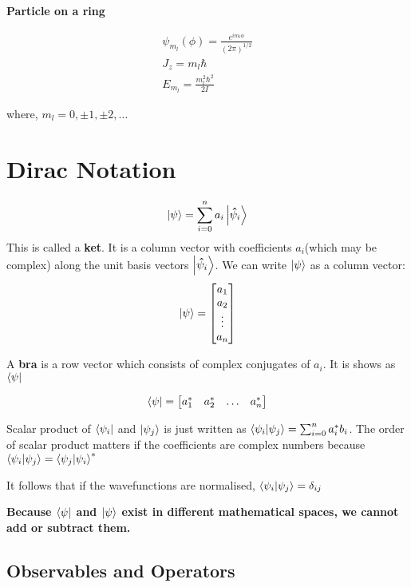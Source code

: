 \documentclass[11pt]{article}
\theoremstyle{definition}
\begin{document}
\begin{shaded}
\textbf{Particle on a ring}

\begin{gather*}
    \psi_{m_l}(\phi) = \frac{e^{i m_l \phi}}{(2\pi)^{1/2}}\\
    J_{z} = m_l \hbar \\
    E_{m_l} = \frac{m_l ^2 \hbar^2}{2I}
\end{gather*}

where, $m_l = 0, \pm 1, \pm 2, \dots$
\end{shaded}

\section{Dirac Notation}

\begin{equation*}
    \ket{\psi} = \sum_{i=0}^n a_{i}\ket{\vectorunit{\psi}_i}
\end{equation*}
This is called a \textbf{ket}. It is a column vector with coefficients $a_i$(which may be complex) along the unit basis vectors $\ket{\vectorunit{\psi}_i}$. We can write $\ket{\psi}$ as a column vector:
\begin{equation}
   \ket{\psi}= \mqty[a_1 \\ a_2 \\ \vdots \\ a_n]
\end{equation}

A \textbf{bra} is a row vector which consists of complex conjugates of $a_i$. It is shows as $\bra{\psi}$

\begin{equation}
   \bra{\psi}= \mqty[a_1^* & a_2^* & \dots & a_n^*]
\end{equation}

Scalar product of $\bra{\psi_i}$ and $\ket{\psi_j}$ is just written as $\bra{\psi_i}\ket{\psi_j} = \sum_{i=0}^n a_i^* b_i$. The order of scalar product matters if the coefficients are complex numbers because $\bra{\psi_i}\ket{\psi_j} =  \bra{\psi_j}\ket{\psi_i}^*$

It follows that if the wavefunctions are normalised,  $\bra{\psi_i}\ket{\psi_j} = \delta_{ij}$

\textbf{Because $\bra{\psi}$ and $\ket{\psi}$ exist in different mathematical spaces, we cannot add or subtract them.}

\subsection{Observables and Operators}
\end{document}
